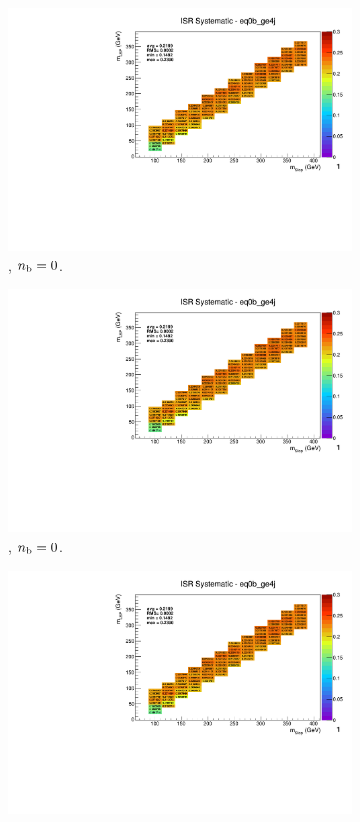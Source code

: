 \begin{figure}[ht!]
\begin{subfigure}[b]{0.32\textwidth}
    \includegraphics[width=\textwidth, page=12]{Figs/sms/t2degen/v19/systs/T2_4body_ISR_eq0b_ge4j.pdf}
    \caption{\njhigh, $n_{\text{b}} = 0$.}
  \end{subfigure}
  \begin{subfigure}[b]{0.32\textwidth}
    \includegraphics[width=\textwidth, page=8]{Figs/sms/t2degen/v19/systs/T2_4body_ISR_eq0b_ge4j.pdf}
    \caption{\njhigh, $n_{\text{b}} = 0$.}
  \end{subfigure}
  \begin{subfigure}[b]{0.32\textwidth}
    \includegraphics[width=\textwidth, page=1]{Figs/sms/t2degen/v19/systs/T2_4body_ISR_eq0b_ge4j.pdf}

\end{subfigure}
\end{figure}
